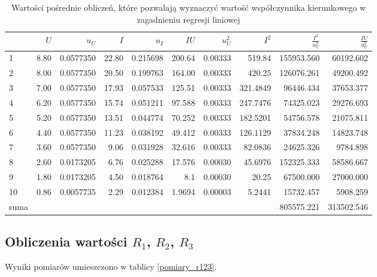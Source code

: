 \documentclass[a4paper]{article}
\begin{document}
\begin{table}[h]
\centering
\begin{tabular}{lrrrrrrrrr}
\toprule
{} &  $U$  &    $u_U$  &     $I$ &    $u_I$   &    $IU$  &    $u_U^2$ &   $I^2$ &    $\frac{I^2}{u_U^2}$ & $\frac{IU}{u_U^2}$ \\
\midrule
1  &  8.80 &  0.0577350 &  22.80 &  0.215698  & 200.64   &  0.00333 &  519.84    & 155953.560  & 60192.602 \\
2  &  8.00 &  0.0577350 &  20.50 &  0.199763  & 164.00   &  0.00333 &  420.25    & 126076.261  & 49200.492 \\
3  &  7.00 &  0.0577350 &  17.93 &  0.057533  & 125.51   &  0.00333 &  321.4849  &  96446.434  & 37653.377 \\
4  &  6.20 &  0.0577350 &  15.74 &  0.051211  &  97.588  &  0.00333 &  247.7476  &  74325.023  & 29276.693 \\
5  &  5.20 &  0.0577350 &  13.51 &  0.044774  &  70.252  &  0.00333 &  182.5201  &  54756.578  & 21075.811 \\
6  &  4.40 &  0.0577350 &  11.23 &  0.038192  &  49.412  &  0.00333 &  126.1129  &  37834.248  & 14823.748 \\
7  &  3.60 &  0.0577350 &   9.06 &  0.031928  &  32.616  &  0.00333 &   82.0836  &  24625.326  &  9784.898 \\
8  &  2.60 &  0.0173205 &   6.76 &  0.025288  &  17.576  &  0.00030 &   45.6976  & 152325.333  & 58586.667 \\
9  &  1.80 &  0.0173205 &   4.50 &  0.018764  &   8.1    &  0.00030 &   20.25    &  67500.000  & 27000.000 \\
10 &  0.86 &  0.0057735 &   2.29 &  0.012384  &   1.9694 &  0.00003 &    5.2441  &  15732.457  &  5908.259 \\
\midrule
	suma & {} & {} & {} & {} & {} & {} & {} & 805575.221 & 313502.546 \\
\bottomrule
\end{tabular}
\caption{Wartości pośrednie obliczeń, które pozwalają wyznaczyć wartość współczynnika kierunkowego w zagadnieniu regresji liniowej}
\label{wartosci_posrednie}
\end{table}


\subsection{Obliczenia wartości $R_1$, $R_2$, $R_3$}

Wyniki pomiarów umieszczono w tablicy \ref{pomiary_r123}.
\end{document}
